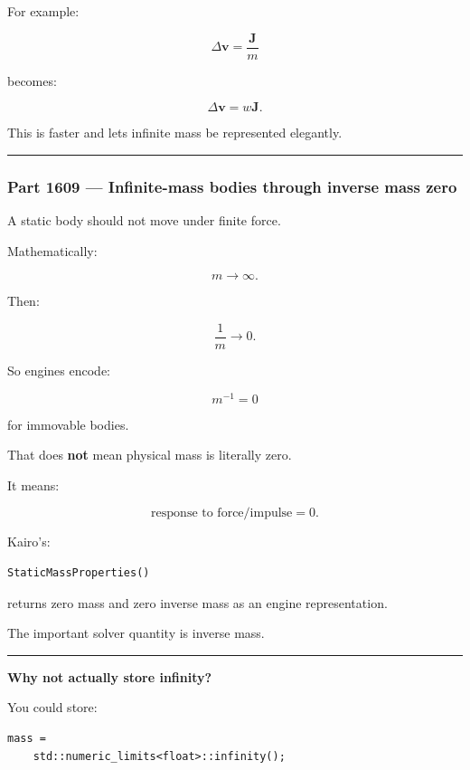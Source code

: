 For example:

\[
\Delta\mathbf{v}
=
\frac{\mathbf{J}}{m}
\]

becomes:

\[
\boxed{
\Delta\mathbf{v}
=
w\mathbf{J}.
}
\]

This is faster and lets infinite mass be represented elegantly.

\begin{center}\rule{0.5\linewidth}{0.5pt}\end{center}

\subsubsection{Part 1609 --- Infinite-mass bodies through inverse mass zero}\label{part-1609-infinite-mass-bodies-through-inverse-mass-zero}

A static body should not move under finite force.

Mathematically:

\[
m\rightarrow\infty.
\]

Then:

\[
\frac{1}{m}
\rightarrow0.
\]

So engines encode:

\[
\boxed{
m^{-1}=0
}
\]

for immovable bodies.

That does \textbf{not} mean physical mass is literally zero.

It means:

\[
\text{response to force/impulse}=0.
\]

Kairo's:

\begin{verbatim}
StaticMassProperties()
\end{verbatim}

returns zero mass and zero inverse mass as an engine representation.

The important solver quantity is inverse mass.

\begin{center}\rule{0.5\linewidth}{0.5pt}\end{center}

\textbf{Why not actually store infinity?}

You could store:

\begin{verbatim}
mass =
    std::numeric_limits<float>::infinity();
\end{verbatim}

